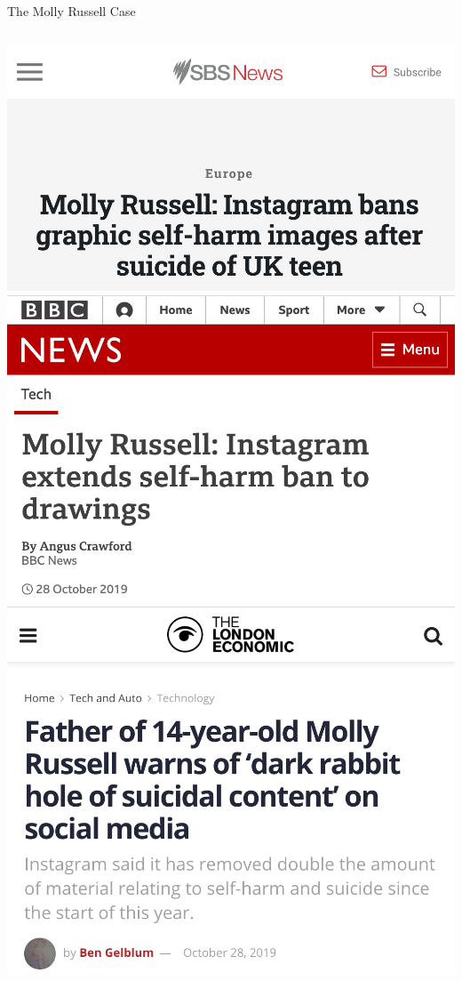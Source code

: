 \documentclass[nobackground,dvipsnames,table,aspectratio=169]{beamer}
\begin{document}
\begin{frame}{The Molly Russell Case}
    \begin{columns}
            \includegraphics[width=\textwidth]{molly-russell-article-1}
            \includegraphics[width=\textwidth]{molly-russell-article-2}
            \includegraphics[width=\textwidth]{molly-russell-article-3}

\end{columns}
\end{frame}
\end{document}
